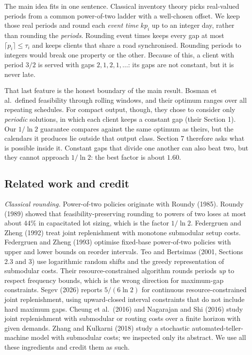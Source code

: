 \documentclass[
  british,
  11pt,
  a4paper,
]{article}
\begin{document}
The main idea fits in one sentence. Classical inventory theory picks
real-valued periods from a common power-of-two ladder with a well-chosen
offset. We keep those real periods and round each \emph{event time}
\(k p_i\) up to an integer day, rather than rounding the \emph{periods}.
Rounding event times keeps every gap at most
\(\lceil p_i\rceil\le\tau_i\) and keeps clients that share a road
synchronised. Rounding periods to integers would break one property or
the other. Because of this, a client with period \(3/2\) is served with
gaps \(2,1,2,1,\ldots\): its gaps are not constant, but it is never
late.

That last feature is the honest boundary of the main result. Bosman et
al.~defined feasibility through rolling windows, and their optimum
ranges over all repeating schedules. For compact output, though, they
chose to consider only \emph{periodic} solutions, in which each client
keeps a constant gap (their Section 1). Our \(1/\ln2\) guarantee
compares against the same optimum as theirs, but the calendars it
produces lie outside that output class. Section 7 therefore asks what is
possible inside it. Constant gaps that divide one another can also beat
two, but they cannot approach \(1/\ln2\): the best factor is about
\(1.60\).

\subsection{Related work and credit}\label{related-work-and-credit}

\emph{Classical rounding.} Power-of-two policies originate with Roundy
(1985). Roundy (1989) showed that feasibility-preserving rounding to
powers of two loses at most about 44\% in capacitated lot sizing, which
is the factor \(1/\ln2\). Federgruen and Zheng (1992) treat joint
replenishment with monotone submodular setup costs. Federgruen and Zheng
(1993) optimise fixed-base power-of-two policies with upper and lower
bounds on reorder intervals. Teo and Bertsimas (2001, Sections 2.3 and
3) use logarithmic random shifts and the greedy representation of
submodular costs. Their resource-constrained algorithm rounds periods
\emph{up} to respect frequency bounds, which is the wrong direction for
maximum-gap constraints. Segev (2026) reports \(5/(6\ln2)\) for
continuous resource-constrained joint replenishment, using upward-closed
interval constraints that do not include hard maximum gaps. Cheung et
al.~(2016) and Nagarajan and Shi (2016) study joint replenishment with
submodular or routing costs over a finite horizon with given demands.
Zhang and Kulkarni (2018) study a stochastic automated-teller-machine
model with submodular costs; we inspected only its abstract. We use all
these ingredients and credit them as such.
\end{document}
